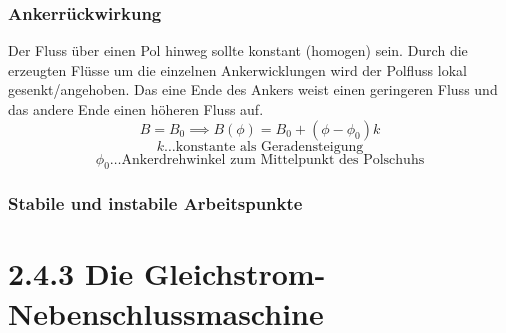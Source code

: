 \documentclass[a4paper]{article}
\begin{document}
\subsubsection*{Ankerrückwirkung}
Der Fluss über einen Pol hinweg sollte konstant (homogen) sein. Durch die erzeugten Flüsse um die einzelnen Ankerwicklungen wird der Polfluss lokal gesenkt/angehoben. Das eine Ende des Ankers weist einen geringeren Fluss und das andere Ende einen höheren Fluss auf.
\[ B=B_{0}\implies B(\phi)=B_{0}+(\phi-\phi_{0})k \]
\[ k\text{\ldots konstante als Geradensteigung} \]
\[ \phi_{0}\text{\ldots Ankerdrehwinkel zum Mittelpunkt des Polschuhs}\]

\subsubsection*{Stabile und instabile Arbeitspunkte}

\section*{2.4.3 Die Gleichstrom-Nebenschlussmaschine}
\end{document}
